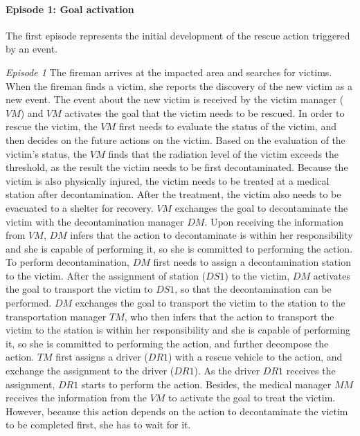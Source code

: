 \paragraph*{Episode 1: Goal activation} %
\label{par:episode_1_goal_activation}
The first episode represents the initial development of the rescue action triggered by an event.

\begin{scenario}
\footnotesize
\emph{Episode 1} The fireman arrives at the impacted area and searches for victims. When the fireman finds a victim, she reports the discovery of the new victim as a new event. The event about the new victim is received by the victim manager ($VM$) and $VM$ activates the goal that the victim needs to be rescued. In order to rescue the victim, the $VM$ first needs to evaluate the status of the victim, and then decides on the future actions on the victim. Based on the evaluation of the victim's status, the $VM$ finds that the radiation level of the victim exceeds the threshold, as the result the victim needs to be first decontaminated. Because the victim is also physically injured, the victim needs to be treated at a medical station after decontamination. After the treatment, the victim also needs to be evacuated to a shelter for recovery. $VM$ exchanges the goal to decontaminate the victim with the decontamination manager $DM$. Upon receiving the information from $VM$, $DM$ infers that the action to decontaminate is within her responsibility and she is capable of performing it, so she is committed to performing the action. To perform decontamination, $DM$ first needs to assign a decontamination station to the victim. After the assignment of station ($DS1$) to the victim, $DM$ activates the goal to transport the victim to $DS1$, so that the decontamination can be performed. $DM$ exchanges the goal to transport the victim to the station to the transportation manager $TM$, who then infers that the action to transport the victim to the station is within her responsibility and she is capable of performing it, so she is committed to performing the action, and further decompose the action. $TM$ first assigns a driver ($DR1$) with a rescue vehicle to the action, and exchange the assignment to the driver ($DR1$). As the driver $DR1$ receives the assignment, $DR1$ starts to perform the action. Besides, the medical manager $MM$ receives the information from the $VM$ to activate the goal to treat the victim. However, because this action depends on the action to decontaminate the victim to be completed first, she has to wait for it.
\end{scenario}

